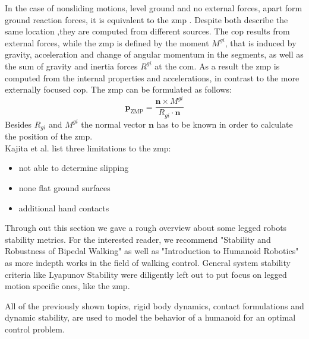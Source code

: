 In the case of nonsliding motions, level ground and no external forces, apart form ground reaction forces, it is equivalent to the \acrfull{zmp} \cite{vukobratovic_1990}.
Despite both describe the same location ,they are computed from different sources.
The \acrshort{cop} results from external forces, while the \acrshort{zmp} is defined by the moment $M^{gi}$, that is induced by gravity, acceleration and change of angular momentum in the segments, as well as the sum of gravity and inertia forces $R^{gi}$ at the \acrshort{com}.
As a result the \acrshort{zmp} is computed from the internal properties and accelerations, in contrast to the more externally focused \acrshort{cop}.
The \acrshort{zmp} can be formulated as follows:
\begin{equation}
  \bm p_\text{ZMP} = \frac{\bm n \times M^{gi}}{R_{gi} \cdot \bm n}
  \label{eq:dynStab:ZMP}
\end{equation}
Besides $R_{gi}$ and $M^{gi}$ the normal vector $\bm n$ has to be known in order to calculate the position of the \acrshort{zmp}.
\\
Kajita et al. list three limitations to the \acrshort{zmp}:
\begin{itemize}
  \item not able to determine slipping
  \item none flat ground surfaces
  \item additional hand contacts
\end{itemize}
\par
Through out this section we gave a rough overview about some legged robots stability metrics.
For the interested reader, we recommend "Stability and Robustness of Bipedal Walking" \cite{sharbafi_2017} as well as "Introduction to Humanoid Robotics" \cite{kajita_2014} as more indepth works in the field of walking control.
General system stability criteria like Lyapunov Stability \cite{lyapunov_1992} were diligently left out to put focus on legged motion specific ones, like the \acrshort{zmp}.
\par
All of the previously shown topics, rigid body dynamics, contact formulations and dynamic stability, are used to model the behavior of a humanoid for an optimal control problem.

